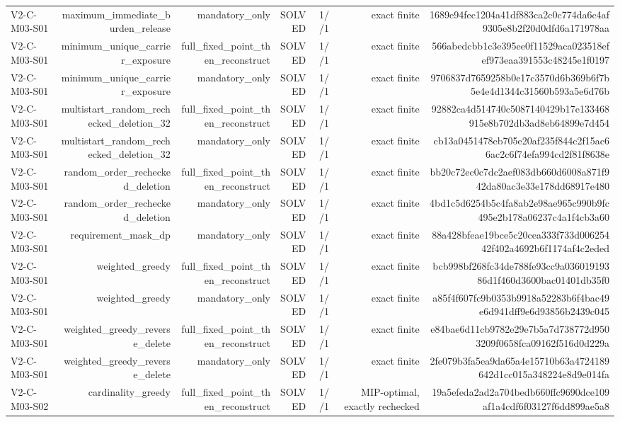 {\begin{longtable}{lrrrrrr}
V2-C-M03-S01 & maximum\_immediate\_burden\_release & mandatory\_only & SOLVED & 1//1 & exact finite & 1689e94fec1204a41df883ca2c0c774da6c4af9305e8b2f20d0dfd6a171978aa \\
V2-C-M03-S01 & minimum\_unique\_carrier\_exposure & full\_fixed\_point\_then\_reconstruct & SOLVED & 1//1 & exact finite & 566abedcbb1c3e395ee0f11529aca023518efef973eaa391553c48245e1f0197 \\
V2-C-M03-S01 & minimum\_unique\_carrier\_exposure & mandatory\_only & SOLVED & 1//1 & exact finite & 9706837d7659258b0e17c3570d6b369b6f7b5e4e4d1344c31560b593a5e6d76b \\
V2-C-M03-S01 & multistart\_random\_rechecked\_deletion\_32 & full\_fixed\_point\_then\_reconstruct & SOLVED & 1//1 & exact finite & 92882ca4d514740c5087140429b17e133468915e8b702db3ad8eb64899e7d454 \\
V2-C-M03-S01 & multistart\_random\_rechecked\_deletion\_32 & mandatory\_only & SOLVED & 1//1 & exact finite & cb13a0451478eb705e20af235f844c2f15ac66ac2c6f74efa994cd2f81f8638e \\
V2-C-M03-S01 & random\_order\_rechecked\_deletion & full\_fixed\_point\_then\_reconstruct & SOLVED & 1//1 & exact finite & bb20c72ec0c7dc2aef083db660d6008a871f942da80ac3e33e178dd68917e480 \\
V2-C-M03-S01 & random\_order\_rechecked\_deletion & mandatory\_only & SOLVED & 1//1 & exact finite & 4bd1c5d6254b5c4fa8ab2e98ae965c990b9fc495e2b178a06237c4a1f4cb3a60 \\
V2-C-M03-S01 & requirement\_mask\_dp & mandatory\_only & SOLVED & 1//1 & exact finite & 88a428bfeae19bce5c20cea333f733d00625442f402a4692b6f1174af4c2eded \\
V2-C-M03-S01 & weighted\_greedy & full\_fixed\_point\_then\_reconstruct & SOLVED & 1//1 & exact finite & bcb998bf268fc34de788fe93cc9a03601919386d1f460d3600bac01401db35f0 \\
V2-C-M03-S01 & weighted\_greedy & mandatory\_only & SOLVED & 1//1 & exact finite & a85f4f607fc9b0353b9918a52283b6f4bac49e6d941dff9e6d93856b2439c045 \\
V2-C-M03-S01 & weighted\_greedy\_reverse\_delete & full\_fixed\_point\_then\_reconstruct & SOLVED & 1//1 & exact finite & e84bae6d11cb9782e29e7b5a7d738772d9503209f0658fca09162f516d0d229a \\
V2-C-M03-S01 & weighted\_greedy\_reverse\_delete & mandatory\_only & SOLVED & 1//1 & exact finite & 2fe079b3fa5ea9da65a4e15710b63a4724189642d1cc015a348224e8d9e014fa \\
V2-C-M03-S02 & cardinality\_greedy & full\_fixed\_point\_then\_reconstruct & SOLVED & 1//1 & MIP-optimal, exactly rechecked & 19a5efeda2ad2a704bedb660ffc9690dce109af1a4cdf6f03127f6dd899ae5a8 \\

\end{longtable}}
